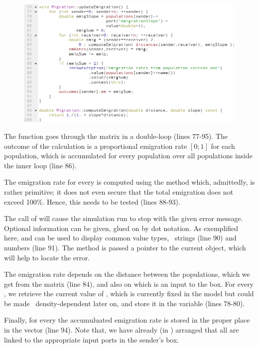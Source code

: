 \begin{figure} [b]
\includegraphics[scale=0.7,left]{graphics/migration-cpp-update-emigration}
\end{figure}

The  function goes through the  matrix in a double-loop (lines 77-95). The outcome of the calculation is a proportional emigration rate $[0;1]$ for each population, which is accumulated for every  population over all  populations inside the inner loop (line 86).

The emigration rate for every  is computed using the  method which, admittedly, is rather primitive; it does not even secure that the total emigration does not exceed 100\%. Hence, this needs to be tested (lines 88-93). 

The call of  will cause the simulation run to stop with the given error message. Optional information can be given, glued on by dot notation. As exemplified here,  and  can be used to display common value types, \eg\ strings (line 90) and numbers (line 91). The  method is passed a pointer to the current object, which will help to locate the error.

The emigration rate depends on the distance between the populations, which we get from the  matrix (line 84), and also on  which is an input to the  box. For every , we retrieve the current value of , which is currently fixed in the model but could be made \eg\ density-dependent later on, and store it in the  variable (lines 78-80).

Finally, for every  the accumuluated emigration rate is stored in the proper place in the  vector (line 94). Note that, we have already (in ) arranged that all  are linked to the appropriate input ports in the sender's  box.

